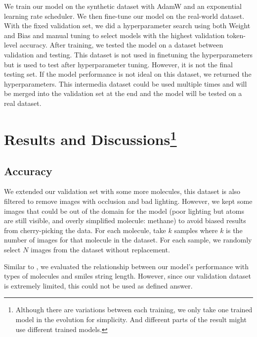 \documentclass[12pt]{article}
\begin{document}
We train our model on the synthetic dataset with AdamW \autocite{adamw} and an exponential learning rate scheduler. We then fine-tune our model on the real-world dataset. With the fixed validation set, we did a hyperparameter search using both Weight and Bias \autocite{wandb} and manual tuning to select models with the highest validation token-level accuracy.  
After training, we tested the model on a dataset between validation and testing. This dataset is not used in finetuning the hyperparameters but is used to test after hyperparameter tuning. However, it is not the final testing set. If the model performance is not ideal on this dataset, we returned the hyperparameters. This intermedia dataset could be used multiple times and will be merged into the validation set at the end and the model will be tested on a real dataset.
\section[Results and Discussions]{Results and Discussions\footnote{Although there are variations between each training, we only take one trained model in the evolution for simplicity. And different parts of the result might use different trained models. }}
\subsection{Accuracy}
We extended our validation set with some more molecules, this dataset is also filtered to remove images with occlusion and bad lighting. However, we kept some images that could be out of the domain for the model (poor lighting but atoms are still visible, and overly simplified molecule: methane) to avoid biased results from cherry-picking the data. For each molecule, take $k$ samples where $k$ is the number of images for that molecule in the dataset. For each sample, we randomly select $N$ images from the dataset without replacement. 

Similar to \cite{swinocsr}, we evaluated the relationship between our model's performance with types of molecules and smiles string length. However, since our validation dataset is extremely limited, this could not be used as defined answer. 
\end{document}
